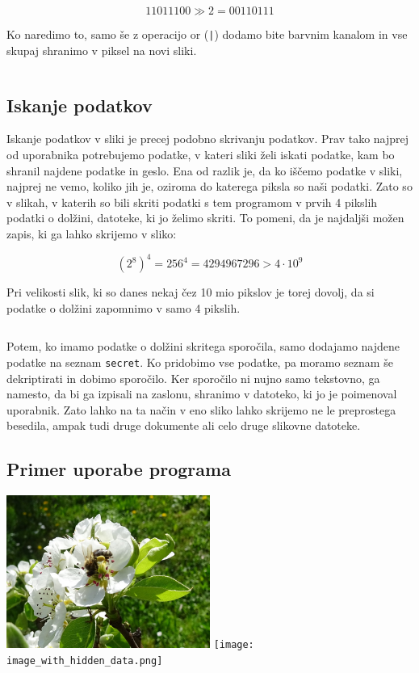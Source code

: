     $$11011100 \gg 2 = 00110111$$

    Ko naredimo to, samo še z operacijo or (\texttt{|}) dodamo bite barvnim kanalom in vse skupaj shranimo v piksel na novi sliki.

    \inputminted[firstline=53, lastline=53, frame=lines]{python}{latex/code_parts.py}


\subsection{Iskanje podatkov}
    Iskanje podatkov v sliki je precej podobno skrivanju podatkov. Prav tako najprej od uporabnika potrebujemo podatke, v kateri sliki želi iskati podatke, kam bo shranil najdene podatke in geslo. Ena od razlik je, da ko iščemo podatke v sliki, najprej ne vemo, koliko jih je, oziroma do katerega piksla so naši podatki. Zato so v slikah, v katerih so bili skriti podatki s tem programom v prvih 4 pikslih podatki o dolžini, datoteke, ki jo želimo skriti. To pomeni, da je najdaljši možen zapis, ki ga lahko skrijemo v sliko:

    $$(2^8)^4 = 256^4 = 4294967296 > 4 \cdot 10^9$$

    Pri velikosti slik, ki so danes nekaj čez 10 mio pikslov je torej dovolj, da si podatke o dolžini zapomnimo v samo 4 pikslih. 

    \inputminted[firstline=55, lastline=87, frame=lines]{python}{latex/code_parts.py}

    Potem, ko imamo podatke o dolžini skritega sporočila, samo dodajamo najdene podatke na seznam \texttt{secret}. Ko pridobimo vse podatke, pa moramo seznam še dekriptirati in dobimo sporočilo. Ker sporočilo ni nujno samo tekstovno, ga namesto, da bi ga izpisali na zaslonu, shranimo v datoteko, ki jo je poimenoval uporabnik. Zato lahko na ta način v eno sliko lahko skrijemo ne le preprostega besedila, ampak tudi druge dokumente ali celo druge slikovne datoteke.


\subsection{Primer uporabe programa}
    \includegraphics[width=0.5\textwidth]{image.png}
    \texttt{[image: image\_with\_hidden\_data.png]}

